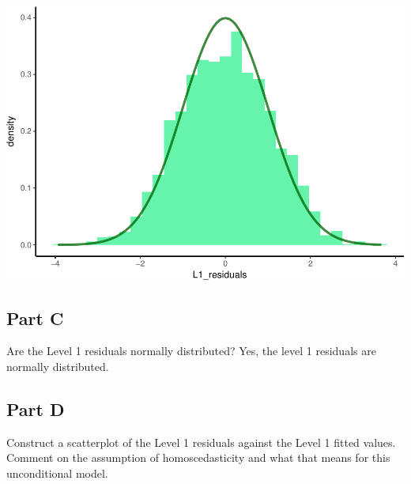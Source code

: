 \documentclass[]{article}
\newenvironment{Shaded}{\begin{snugshade}}{\end{snugshade}}
\newcommand{\KeywordTok}[1]{\textcolor[rgb]{0.13,0.29,0.53}{\textbf{#1}}}
\newcommand{\DataTypeTok}[1]{\textcolor[rgb]{0.13,0.29,0.53}{#1}}
\newcommand{\StringTok}[1]{\textcolor[rgb]{0.31,0.60,0.02}{#1}}
\newcommand{\OperatorTok}[1]{\textcolor[rgb]{0.81,0.36,0.00}{\textbf{#1}}}
\newcommand{\NormalTok}[1]{#1}
\begin{document}
\includegraphics{Beck_HW_5_R_2_files/figure-latex/unnamed-chunk-4-1.pdf}

\subsection{Part C}\label{part-c}

Are the Level 1 residuals normally distributed? Yes, the level 1
residuals are normally distributed.

\subsection{Part D}\label{part-d}

Construct a scatterplot of the Level 1 residuals against the Level 1
fitted values. Comment on the assumption of homoscedasticity and what
that means for this unconditional model.

\begin{Shaded}
\end{Shaded}
\end{document}

